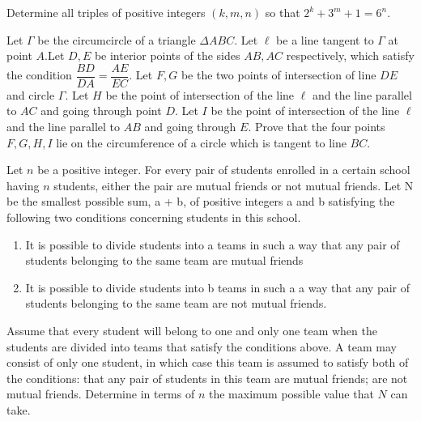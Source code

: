 \documentclass{subfile}
\begin{document}
		\begin{problem}
			Determine all triples of positive integers $(k,m,n)$ so that $2^k+3^m+1=6^n$.
		\end{problem}
		
		\begin{problem}
			Let $\Gamma$ be the circumcircle of a triangle $\Delta ABC$. Let $\ell$ be a line tangent to $\Gamma$ at point $A$.Let $D, E$ be interior points of the sides $AB, AC$ respectively, which satisfy the condition $\dfrac{BD}{DA}=\dfrac{AE}{EC}$. Let $F, G$ be the two points of intersection of line $DE$ and circle $\Gamma$. Let $H$ be the	point of intersection of the line $\ell$ and the line parallel to $AC$ and going through point $D$. Let $I$ be the point of intersection of the line $\ell$ and the line parallel to $AB$ and going through $E$.
			Prove that the four points $F, G, H, I$ lie on the circumference of a circle which is tangent to line $BC$.
		\end{problem}
		
		\begin{problem}
			Let $n$ be a positive integer. For every pair of students enrolled in a certain school having $n$ students, either the pair are mutual friends or not mutual friends. Let N be the smallest possible sum, a + b, of positive integers a and b satisfying the following two conditions concerning students in this school.
			\begin{enumerate}
				\item It is possible to divide students into a teams in such a way that any pair of students belonging to the same team are mutual friends
				\item It is possible to divide students into b teams in such a a way that any pair of students belonging to the same team are not mutual friends.
			\end{enumerate}
			Assume that every student will belong to one and only one team when the students are divided into teams that satisfy the conditions above. A team may consist of only one student, in which case this team is assumed to satisfy both of the conditions: that any pair of students in this team are mutual friends; are not mutual friends. Determine in terms of $n$ the maximum
			possible value that $N$ can take.
		\end{problem}
\end{document}
